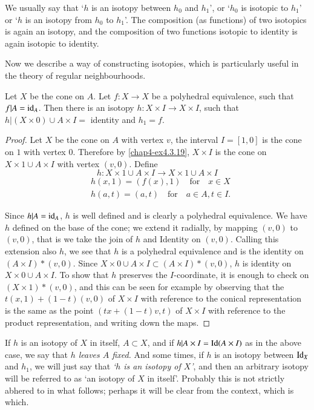 We usually say that `$h$ is an isotopy between $h_{0}$ and $h_{1}$', or `$h_{0}$ is isotopic to $h_{1}$' or `$h$ is an isotopy from $h_{0}$ to $h_{1}$'. The composition (as functions) of two isotopics is again an isotopy, and the composition of two functions isotopic to identity is again isotopic to identity.

Now we describe a way of constructing isotopies, which is particularly useful in the theory of regular neighbourhoods.

\begin{proposition}\label{chap6-prop6.1.2}
Let $X$ be the cone on $A$. Let $f:X\to X$ be a polyhedral equivalence, such that $f|A=\text{\rm id}_{A}$. Then there is an isotopy $h:X\times I\to X\times I$, such that $h|(X\times 0)\cup A\times I=$ identity and $h_{1}=f$.
\end{proposition}

\begin{proof}
Let $X$ be the cone on $A$ with vertex $v$, the interval $I=[1,0]$ is the cone on $1$ with vertex $0$. Therefore by \ref{chap4-ex4.3.19}, $X\times I$ is the cone on $X\times 1\cup A\times I$ with vertex $(v,0)$. Define 
$$
h:X\times 1\cup A\times I\to X\times 1\cup A\times I
$$\pageoriginale
\begin{align*}
& h(x,1)=(f(x),1)\quad\text{for}\quad x\in X\\
& h(a,t)=(a,t)\quad\text{for}\quad a\in A, t\in I.
\end{align*}

Since $h|A=\operatorname{id}_{A}$, $h$ is well defined and is clearly a polyhedral equivalence. We have $h$ defined on the base of the cone; we extend it radially, by mapping $(v,0)$ to $(v,0)$, that is we take the join of $h$ and Identity on $(v,0)$. Calling this extension also $h$, we see that $h$ is a polyhedral equivalence and is the identity on $(A\times I)\ast (v,0)$. Since $X\times 0\cup A\times I\subset (A\times I)\ast (v,0)$, $h$ is identity on $X\times 0\cup A\times I$. To show that $h$ preserves the $I$-coordinate, it is enough to check on $(X\times 1)\ast (v,0)$, and this can be seen for example by observing that the $t(x,1)+(1-t)(v,0)$ of $X\times I$ with reference to the conical representation is the same as the point $(tx+(1-t)v,t)$ of $X\times I$ with reference to the product representation, and writing down the maps.
\end{proof}

If $h$ is an isotopy of $X$ in itself, $A\subset X$, and if $h|A\times I=\operatorname{Id}(A\times I)$ as in the above case, we say that {\em $h$ leaves $A$ fixed.} And some times, if $h$ is an isotopy between $\operatorname{Id}_{X}$ and $h_{1}$, we will just say that {\em `$h$ is an isotopy of $X$'}, and then an arbitrary isotopy will be referred to as `an isotopy of $X$ in itself'. Probably this is not strictly abhered to in what follows; perhaps it will be clear from the context, which is which.

